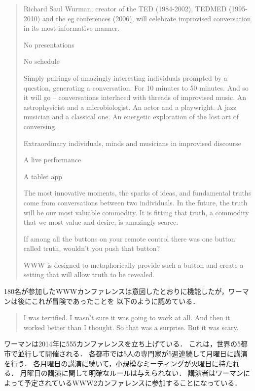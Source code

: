 \documentclass[submit,techreq,jkeyword,noauthor]{ipsj}
\begin{document}
\begin{quote}
Richard Saul Wurman, creator of the TED (1984-2002), TEDMED (1995-2010) and the eg 
conferences (2006), will celebrate improvised conversation in its most informative manner.

No presentations

No schedule

Simply pairings of amazingly interesting individuals prompted by a question, generating a 
conversation. For 10 minutes to 50 minutes. And so it will go – conversations interlaced 
with threads of improvised music. An astrophysicist and a microbiologist. An actor and a 
playwright. A jazz musician and a classical one. An energetic exploration of the lost art 
of conversing.

Extraordinary individuals,
minds and musicians in improvised discourse

A live performance

A tablet app

The most innovative moments, the sparks of ideas, and fundamental truths come from 
conversations between two individuals.
In the future, the truth will be our most valuable commodity. It is fitting that truth, 
a commodity that we most value and desire, is amazingly scarce.

If among all the buttons on your remote control there was one button called truth, 
wouldn't you push that button?

WWW is designed to metaphorically provide such a button and create a setting that 
will allow truth to be revealed.	
\end{quote}

180名が参加したWWWカンファレンスは意図したとおりに機能したが，ワーマンは後にこれが冒険であったことを
以下のように認めている．\cite{ek}

\begin{quote}
I was terrified. I wasn't sure it was going to work at all. And then it worked better 
than I thought. So that was a surprise. But it was scary.
\end{quote}


ワーマンは2014年に555カンファレンスを立ち上げている．
これは，世界の5都市で並行して開催される．
各都市では5人の専門家が5週連続して月曜日に講演を行う．
各月曜日の講演に続いて，小規模なミーティングが火曜日に持たれる．
月曜日の講演に関して明確なルールは与えられない．
講演者はワーマンによって予定されているWWW2カンファレンスに参加することになっている．\cite{ek}
\end{document}
